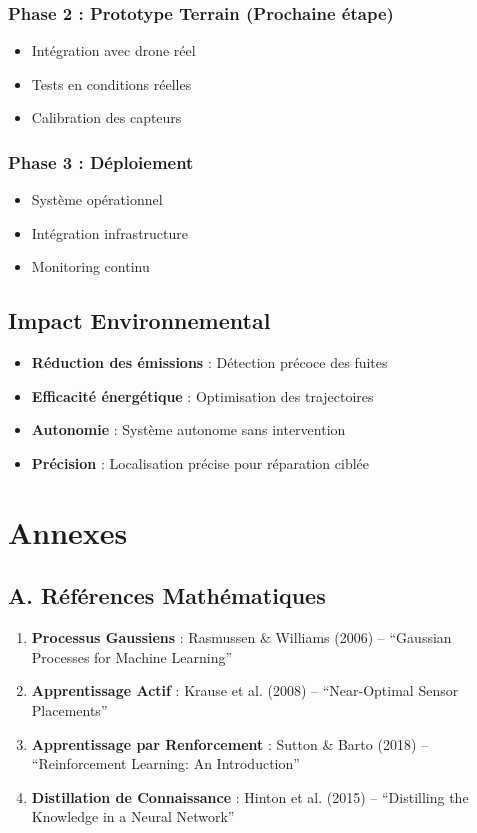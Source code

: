 \documentclass[12pt,a4paper]{article}
\begin{document}
\subsubsection{Phase 2 : Prototype Terrain (Prochaine étape)}
\begin{itemize}
    \item Intégration avec drone réel
    \item Tests en conditions réelles
    \item Calibration des capteurs
\end{itemize}

\subsubsection{Phase 3 : Déploiement}
\begin{itemize}
    \item Système opérationnel
    \item Intégration infrastructure
    \item Monitoring continu
\end{itemize}

\subsection{Impact Environnemental}

\begin{itemize}
    \item \textbf{Réduction des émissions} : Détection précoce des fuites
    \item \textbf{Efficacité énergétique} : Optimisation des trajectoires
    \item \textbf{Autonomie} : Système autonome sans intervention
    \item \textbf{Précision} : Localisation précise pour réparation ciblée
\end{itemize}

\section*{Annexes}

\subsection*{A. Références Mathématiques}

\begin{enumerate}
    \item \textbf{Processus Gaussiens} : Rasmussen \& Williams (2006) -- ``Gaussian Processes for Machine Learning''
    \item \textbf{Apprentissage Actif} : Krause et al. (2008) -- ``Near-Optimal Sensor Placements''
    \item \textbf{Apprentissage par Renforcement} : Sutton \& Barto (2018) -- ``Reinforcement Learning: An Introduction''
    \item \textbf{Distillation de Connaissance} : Hinton et al. (2015) -- ``Distilling the Knowledge in a Neural Network''
\end{enumerate}
\end{document}
